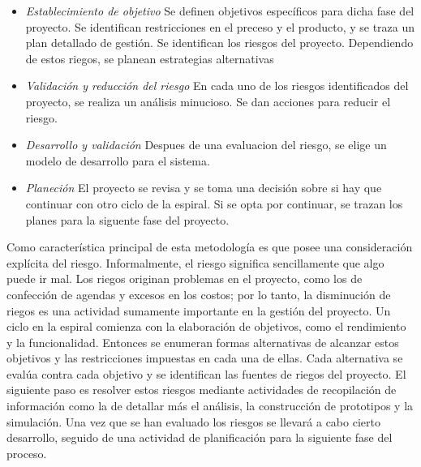 \begin {itemize}
\item 
\textit{Establecimiento de objetivo}  Se definen objetivos específicos para dicha fase del proyecto. Se identifican restricciones en el preceso y el producto, y se traza un plan detallado de gestión. Se identifican los riesgos del proyecto. Dependiendo de estos riegos, se planean estrategias alternativas
\item 
\textit{Validación y reducción del riesgo}  En cada uno de los riesgos identificados del proyecto, se realiza un análisis minucioso. Se dan acciones para reducir el riesgo.
\item 
\textit{Desarrollo y validación}  Despues de una evaluacion del riesgo, se elige un modelo de desarrollo para el sistema.
\item 
\textit{Planeción}  El proyecto se revisa y se toma una decisión sobre si hay que continuar con otro ciclo de la espiral. Si se opta por continuar, se trazan los planes para la siguente fase del proyecto.
 \end {itemize}

Como característica principal de esta metodología es que posee una consideración explícita del riesgo. Informalmente, el riesgo significa sencillamente que algo puede ir mal. Los riegos originan problemas en el proyecto, como los de confección de agendas y excesos en los costos; por lo tanto, la disminución de riegos es una actividad sumamente importante en la gestión del proyecto.
Un ciclo en la espiral comienza con la elaboración de objetivos, como el rendimiento y la funcionalidad. Entonces se enumeran formas alternativas de alcanzar estos objetivos y las restricciones impuestas en cada una de ellas. Cada alternativa se evalúa contra cada objetivo y se identifican las fuentes de riegos del proyecto. El siguiente paso es resolver estos riesgos mediante actividades de recopilación de información como la de detallar más el análisis, la construcción de prototipos y la simulación. Una vez que se han evaluado los riesgos se llevará a cabo cierto desarrollo, seguido de una actividad de planificación para la siguiente fase del proceso.


